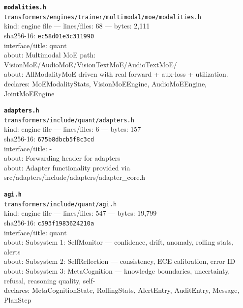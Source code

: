 \noindent\textbf{\texttt{modalities.h}}\\
\texttt{transformers/engines/trainer/multimodal/moe/modalities.h}\\
kind: engine file --- lines/files: 68 --- bytes: 2,111\\
sha256-16: \texttt{ec58d01e3c311990}\\
interface/title: quant\\
about: Multimodal MoE path: VisionMoE/AudioMoE/VisionTextMoE/AudioTextMoE/\\
about: AllModalityMoE driven with real forward + aux-loss + utilization.\\
declares: MoEModalityStats, VisionMoEEngine, AudioMoEEngine, JointMoEEngine\\
\vspace*{6.0pt}
\newpage

\noindent\textbf{\texttt{adapters.h}}\\
\texttt{transformers/include/quant/adapters.h}\\
kind: engine file --- lines/files: 6 --- bytes: 157\\
sha256-16: \texttt{675b8dbcb5f8c3cd}\\
interface/title: -\\
about: Forwarding header for adapters\\
about: Adapter functionality provided via src/adapters/include/adapters/adapter\_core.h\\
\vspace*{6.0pt}

\noindent\textbf{\texttt{agi.h}}\\
\texttt{transformers/include/quant/agi.h}\\
kind: engine file --- lines/files: 547 --- bytes: 19,799\\
sha256-16: \texttt{c593f1983624210a}\\
interface/title: quant\\
about: Subsystem 1: SelfMonitor — confidence, drift, anomaly, rolling stats, alerts\\
about: Subsystem 2: SelfReflection — consistency, ECE calibration, error ID\\
about: Subsystem 3: MetaCognition — knowledge boundaries, uncertainty, refusal, reasoning quality, self-\\
declares: MetaCognitionState, RollingStats, AlertEntry, AuditEntry, Message, PlanStep\\
\vspace*{6.0pt}

